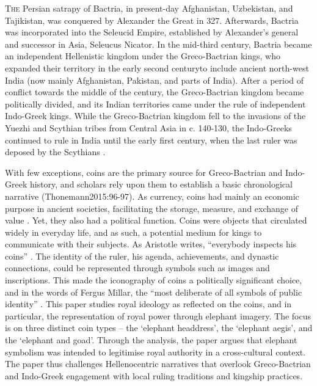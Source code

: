 \documentclass{ijsra}
\begin{document}
\IJSRAopening%

\lettrine{T}{he} Persian satrapy of Bactria, in present-day Afghanistan, Uzbekistan, and Tajikistan,
was conquered by Alexander the Great in 327\BC.
Afterwards, Bactria was incorporated into the Seleucid Empire, established by Alexander’s general and successor in Asia,
Seleucus Nicator.
In the mid-third century\BC, Bactria became an independent Hellenistic kingdom under the Greco-Bactrian kings, 
who expanded their territory in the early second century\BC to include ancient north-west India (now mainly Afghanistan, Pakistan,
and parts of India).
After a period of conflict towards the middle of the century, the Greco-Bactrian kingdom became politically divided,
and its Indian territories came under the rule of independent Indo-Greek kings.
While the Greco-Bactrian kingdom fell to the invasions of the Yuezhi and Scythian tribes from Central Asia in c. 140-130\BC,
the Indo-Greeks continued to rule in India until the early first century\AD, when the last ruler was deposed by the Scythians
\parencite[47--51]{Bopearachchi2011}. 

With few exceptions, coins are the primary source for Greco-Bactrian and Indo-Greek history, and scholars rely upon them to establish
a basic chronological narrative (Thonemann2015:96-97).
As currency, coins had mainly an economic purpose in ancient societies, facilitating the storage, measure, and exchange of value
\parencite[11]{Howgego1995}.
Yet, they also had a political function.
Coins were objects that circulated widely in everyday life, and as such, a potential medium for kings to communicate with their subjects.
As Aristotle writes, “everybody inspects his coins” \parencite[120]{Holt1999}.
The identity of the ruler, his agenda, achievements, and dynastic connections, could be represented through symbols such as images
and inscriptions.
This made the iconography of coins a politically significant choice, and in the words of Fergus Millar, the “most deliberate of all
symbols of public identity” \parencite[66]{Thonemann2015}.
This paper studies royal ideology as reflected on the coins, and in particular, the representation of royal power through elephant imagery.
The focus is on three distinct coin types – the ‘elephant headdress’, the ‘elephant aegis’, and the ‘elephant and goad’.
Through the analysis, the paper argues that elephant symbolism was intended to legitimise royal authority in a cross-cultural context.
The paper thus challenges Hellenocentric narratives that overlook Greco-Bactrian and Indo-Greek engagement with local ruling traditions
and kingship practices.
\end{document}
